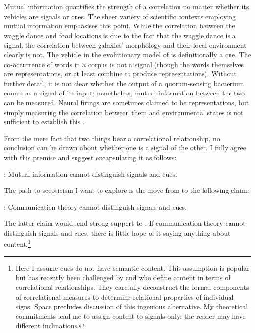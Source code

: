 \documentclass[12pt]{article}
\begin{document}
Mutual information quantifies the strength of a correlation no matter whether its vehicles are signals or cues.
The sheer variety of scientific contexts employing mutual information emphasises this point.
While the correlation between the waggle dance and food locations is due to the fact that the waggle dance is a signal, the correlation between galaxies' morphology and their local environment clearly is not.
The vehicle in the evolutionary model of \citet{donaldson-matasci2010fitness} is definitionally a cue.
The co-occurrence of words in a corpus is not a signal (though the words themselves are representations, or at least combine to produce representations).
Without further detail, it is not clear whether the output of a quorum-sensing bacterium counts as a signal of its input; nonetheless, mutual information between the two can be measured.
Neural firings are sometimes claimed to be representations, but simply measuring the correlation between them and environmental states is not sufficient to establish this \citep{rathkopf2017neural}.

From the mere fact that two things bear a correlational relationship, no conclusion can be drawn about whether one is a signal of the other.
I fully agree with this premise and suggest encapsulating it as follows:

\begin{myquote}
\ami: Mutual information cannot distinguish signals and cues.
\end{myquote}

\noindent The path to scepticism I want to explore is the move from \ami{} to the following claim:

\begin{myquote}
\act: Communication theory cannot distinguish signals and cues.
\end{myquote}

\noindent The latter claim would lend strong support to \tic{}.
If communication theory cannot distinguish signals and cues, there is little hope of it saying anything about content.\footnote{Here I assume cues do not have semantic content. This assumption is popular but has recently been challenged by \citet{isaac2018semantics} and \citet[$\S$3]{skyrms2010signals} who define content in terms of correlational relationships. They carefully deconstruct the formal components of correlational measures to determine relational properties of individual signs. Space precludes discussion of this ingenious alternative. My theoretical commitments lead me to assign content to signals only; the reader may have different inclinations.}
\end{document}
